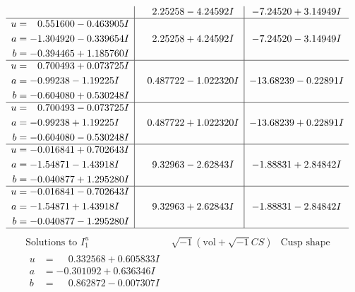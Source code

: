 \documentclass[1p]{elsarticle_modified}
\theoremstyle{definition}
\newcommand{\I}{\sqrt{-1}}
\begin{document}
$$\begin{array}{c|c|c}
 & \phantom{-}2.25258 - 4.24592 I & -7.24520 + 3.14949 I \\ \hline\begin{aligned}
u &= \phantom{-}0.551600 - 0.463905 I \\
a &= -1.304920 - 0.339654 I \\
b &= -0.394465 + 1.185760 I\end{aligned}
 & \phantom{-}2.25258 + 4.24592 I & -7.24520 - 3.14949 I \\ \hline\begin{aligned}
u &= \phantom{-}0.700493 + 0.073725 I \\
a &= -0.99238 - 1.19225 I \\
b &= -0.604080 + 0.530248 I\end{aligned}
 & \phantom{-}0.487722 - 1.022320 I & -13.68239 - 0.22891 I \\ \hline\begin{aligned}
u &= \phantom{-}0.700493 - 0.073725 I \\
a &= -0.99238 + 1.19225 I \\
b &= -0.604080 - 0.530248 I\end{aligned}
 & \phantom{-}0.487722 + 1.022320 I & -13.68239 + 0.22891 I \\ \hline\begin{aligned}
u &= -0.016841 + 0.702643 I \\
a &= -1.54871 - 1.43918 I \\
b &= -0.040877 + 1.295280 I\end{aligned}
 & \phantom{-}9.32963 - 2.62843 I & -1.88831 + 2.84842 I \\ \hline\begin{aligned}
u &= -0.016841 - 0.702643 I \\
a &= -1.54871 + 1.43918 I \\
b &= -0.040877 - 1.295280 I\end{aligned}
 & \phantom{-}9.32963 + 2.62843 I & -1.88831 - 2.84842 I\\
 \hline 
 \end{array}$$\newpage$$\begin{array}{c|c|c}  
\text{Solutions to }I^u_{1}& \I (\text{vol} + \sqrt{-1}CS) & \text{Cusp shape}\\
 \hline 
\begin{aligned}
u &= \phantom{-}0.332568 + 0.605833 I \\
a &= -0.301092 + 0.636346 I \\
b &= \phantom{-}0.862872 - 0.007307 I\end{aligned}

\end{array}$$
\end{document}
